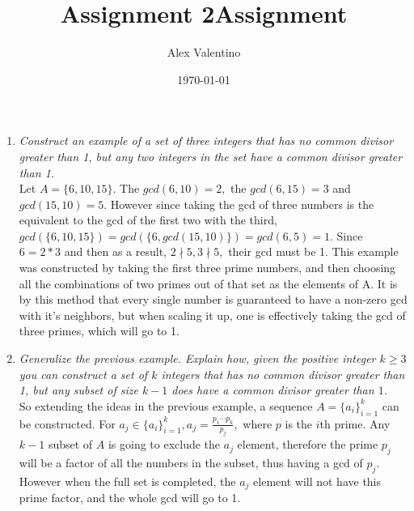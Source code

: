 \documentclass[12pt, letterpaper]{article}
\date{\today}
\title{Assignment 2}
\author{Alex Valentino}
\title{Assignment }
\begin{document}
	\begin{enumerate}
			\item \textit{Construct an example of a set of three integers that has no common divisor greater than
1, but any two integers in the set have a common divisor greater than 1.}\\
Let $A = \{6,10,15\}$. The $gcd(6,10) = 2,$ the $gcd(6,15) = 3$ and $gcd(15,10)=5.$  However since taking the gcd of three numbers is the equivalent to the gcd of the first two with the third, $gcd(\{6,10,15\}) = gcd(\{6,gcd(15,10)\}) = gcd(6,5) = 1.$   Since $6 = 2*3$ and then as a result, $2 \nmid 5, 3\nmid 5,$ their gcd must be 1.  This example was constructed by taking the first three prime numbers, and then choosing all the combinations of two primes out of that set as the elements of A.  It is by this method that every single number is guaranteed to have a non-zero gcd with it's neighbors, but when scaling it up, one is effectively taking the gcd of three primes, which will go to 1.
		\item \textit{Generalize the previous example. Explain how, given the positive integer $k \geq 3$ you can
construct a set of $k$ integers that has no common divisor greater than 1, but any subset
of size $k - 1$ does have a common divisor greater than $1$.}\\
		So extending the ideas in the previous example, a sequence $A = \{a_i\}^k_{i=1}$ can be constructed.  For $a_j \in \{a_i\}^k_{i=1}, a_j = \displaystyle\frac{p_1  \cdots p_k}{p_j},$ where $p$ is the $i$th prime. Any $k-1$ subset of $A$ is going to exclude the $a_j$ element, therefore the prime $p_j$ will be a factor of all the numbers in the subset, thus having a gcd of $p_j.$  However when the full set is completed, the $a_j$ element will not have this prime factor, and the whole gcd will go to 1.
		\end{enumerate}
\end{document}

